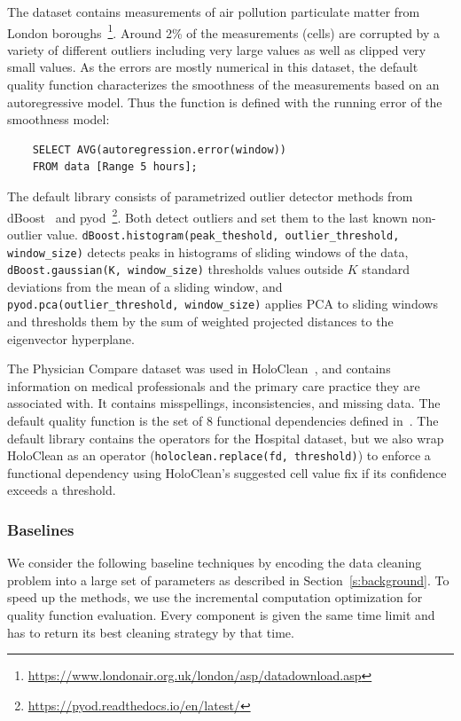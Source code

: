  The dataset contains measurements of air pollution particulate matter from London boroughs~\footnote{\url{https://www.londonair.org.uk/london/asp/datadownload.asp}}. Around 2\% of the measurements (cells) are corrupted by a variety of different outliers including very large values as well as clipped very small values.  As the errors are mostly numerical in this dataset, the default quality function characterizes the smoothness of the measurements based on an autoregressive model.  Thus the function is defined with the running error of the smoothness model:
\begin{verbatim}
    SELECT AVG(autoregression.error(window))
    FROM data [Range 5 hours];
\end{verbatim}
\noindent The default library consists of parametrized outlier detector methods from dBoost~\cite{mariet2016outlier} and pyod~\footnote{\url{https://pyod.readthedocs.io/en/latest/}}.  Both detect outliers and set them to the last known non-outlier value. \texttt{dBoost.histogram(peak\_theshold, outlier\_threshold, window\_size)} detects peaks in histograms of sliding windows of the data, \texttt{dBoost.gaussian(K, window\_size)} thresholds values outside $K$ standard deviations  from the mean of a sliding window, and \texttt{pyod.pca(outlier\_threshold, window\_size)}  applies PCA to sliding windows and thresholds them by the sum of weighted projected distances to the eigenvector hyperplane.

 The Physician Compare dataset was used in HoloClean~\cite{rekatsinas2017holoclean}, and contains information on medical professionals and the primary care practice they are associated with.  It contains misspellings, inconsistencies, and missing data. The default quality function is the set of 8 functional dependencies defined in~\cite{rekatsinas2017holoclean}.  The default library contains the operators for the Hospital dataset, but we also wrap HoloClean as an operator (\texttt{holoclean.replace(fd, threshold)}) to enforce a functional dependency using HoloClean's suggested cell value fix if its confidence exceeds a threshold.

\subsubsection{Baselines}
We consider the following baseline techniques by encoding the data cleaning problem into a large set of parameters as described in Section~\ref{s:background}. To speed up the methods, we use the incremental computation optimization for quality function evaluation. Every component is given the same time limit and has to return its best cleaning strategy by that time. 

